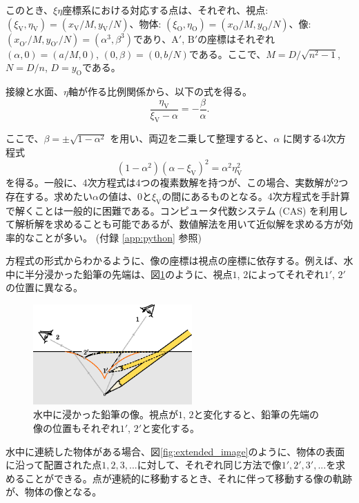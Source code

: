 \documentclass[twocolumn]{article}
\begin{document}
このとき、$\xi\eta$座標系における対応する点は、それぞれ、視点: $(\xi_{\mathrm{V}}^{}, \eta_{\mathrm{V}}^{})=(x_{\mathrm{V}}^{}/M, y_{\mathrm{V}}^{}/N)$、物体: $(\xi_{\mathrm{O}}^{}, \eta_{\mathrm{O}}^{})=(x_{\mathrm{O}}^{}/M, y_{\mathrm{O}}^{}/N)$、像: $(x_{\mathrm{O'}}^{}/M, y_{\mathrm{O'}}^{}/N)=(\alpha^3, \beta^3)$であり、$\mathrm{A'}$, $\mathrm{B'}$の座標はそれぞれ$(\alpha, 0) = (a/M, 0)$, $(0, \beta) = (0, b/N)$である。ここで、$M=D/\sqrt{n^2-1}$, $N=D/n$, $D=y_{\mathrm{O}}^{}$である。

接線と水面、$\eta$軸が作る比例関係から、以下の式を得る。
$$\dfrac{\eta_{\mathrm{V}}^{}}{\xi_{\mathrm{V}}^{}-\alpha}=-\dfrac{\beta}{\alpha}.$$

ここで、$\beta = \pm \sqrt{1-\alpha^2}$ を用い、両辺を二乗して整理すると、$\alpha$ に関する4次方程式
\begin{equation} \label{eqn:tangent}
\left( 1 - \alpha^2 \right) \left(\alpha-\xi_{\mathrm{V}} \right)^2 = \alpha^2 \eta_{\mathrm{V}}^2
\end{equation}
を得る。一般に、4次方程式は4つの複素数解を持つが、この場合、実数解が2つ存在する。求めたい$\alpha$の値は、0と$\xi_{\mathrm{V}}$の間にあるものとなる。4次方程式を手計算で解くことは一般的に困難である。コンピュータ代数システム (CAS) を利用して解析解を求めることも可能であるが、数値解法を用いて近似解を求める方が効率的なことが多い。 (付録 \ref{app:python} 参照)

方程式の形式からわかるように、像の座標は視点の座標に依存する。例えば、水中に半分浸かった鉛筆の先端は、図\ref{fig:pencil_view}のように、視点$1$, $2$によってそれぞれ$1'$, $2'$の位置に異なる。
	
\begin{figure}[h]
	\centering
	\includegraphics[width=2.4in]{figs/g43.eps}
	\caption{水中に浸かった鉛筆の像。視点が$1$, $2$と変化すると、鉛筆の先端の像の位置もそれぞれ$1'$, $2'$と変化する。}
	\label{fig:pencil_view}
\end{figure}

水中に連続した物体がある場合、図\ref{fig:extended_image}のように、物体の表面に沿って配置された点$1, 2, 3, ...$に対して、それぞれ同じ方法で像$1', 2', 3', ...$を求めることができる。点が連続的に移動するとき、それに伴って移動する像の軌跡が、物体の像となる。
\end{document}
